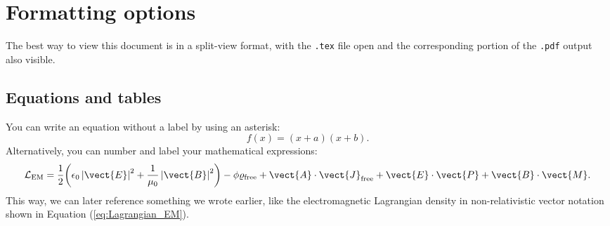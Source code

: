 \chapter{Formatting options}\label{ch:introduction}

The best way to view this document is in a split-view format, with the \texttt{.tex} file open and the corresponding portion of the \texttt{.pdf} output also visible.

\section{Equations and tables}\label{sec:equationexamples}

You can write an equation without a label by using an asterisk:
\begin{equation*}
f(x) = (x+a)(x+b).
\end{equation*}
Alternatively, you can number and label your mathematical expressions:
\begin{equation}\label{eq:Lagrangian_EM}
\mathcal{L}_{\text{EM}} 
  = \frac{1}{2} \biggl( \epsilon_{0} \left| \vect{E} \right|^{2} + \frac{1}{\mu_{0}} \left| \vect{B} \right|^{2} \biggr)
   - \phi \varrho_{\text{free}} + \vect{A} \cdot \vect{J}_{\text{free}}
   + \vect{E} \cdot \vect{P} + \vect{B} \cdot \vect{M}.
\end{equation}
This way, we can later reference something we wrote earlier, like the electromagnetic Lagrangian density in non-relativistic vector notation shown in Equation (\ref{eq:Lagrangian_EM}).\\

